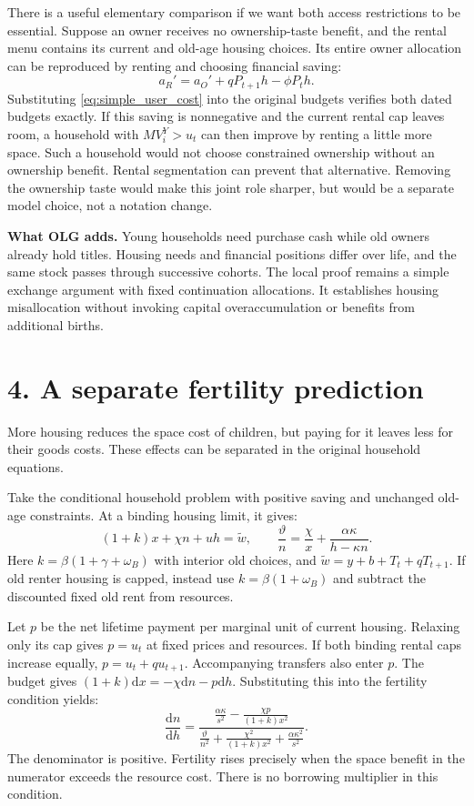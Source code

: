 \documentclass[11pt]{article}
\newcommand{\dd}{\mathrm d}
\newcommand{\pageheading}[1]{\section*{#1}}
\begin{document}
There is a useful elementary comparison if we want both access restrictions
to be essential. Suppose an owner receives no ownership-taste benefit, and
the rental menu contains its current and old-age housing choices. Its entire
owner allocation can be reproduced by renting and choosing financial saving:
\begin{equation}
 a_R'=a_O'+qP_{t+1}h-\phi P_t h.
 \label{eq:simple_replication}
\end{equation}
Substituting \eqref{eq:simple_user_cost} into the original budgets verifies
both dated budgets exactly. If this saving is nonnegative and the current
rental cap leaves room, a household with $MV_i^Y>u_t$ can then improve by
renting a little more space. Such a household would not choose constrained
ownership without an ownership benefit. Rental segmentation can prevent that
alternative. Removing the ownership taste would make this joint role sharper,
but would be a separate model choice, not a notation change.

\textbf{What OLG adds.} Young households need purchase cash while old owners
already hold titles. Housing needs and financial positions differ over life,
and the same stock passes through successive cohorts. The local proof remains
a simple exchange argument with fixed continuation allocations. It establishes
housing misallocation without invoking capital overaccumulation or benefits
from additional births.

\newpage
\pageheading{4. A separate fertility prediction}

More housing reduces the space cost of children, but paying for it leaves
less for their goods costs. These effects can be separated in the original
household equations.

Take the conditional household problem with positive saving and unchanged
old-age constraints. At a binding housing limit, it gives:
\begin{equation}
 (1+k)x+\chi n+uh=\widetilde w,\qquad
 \frac{\vartheta}{n}=\frac{\chi}{x}+\frac{\alpha\kappa}{h-\kappa n}.
 \label{eq:simple_fertility_system}
\end{equation}
Here $k=\beta(1+\gamma+\omega_B)$ with interior old choices, and
$\widetilde w=y+b+T_t+qT_{t+1}$. If old renter housing is capped, instead use
$k=\beta(1+\omega_B)$ and subtract the discounted fixed old rent from resources.

Let $p$ be the net lifetime payment per marginal unit of current housing.
Relaxing only its cap gives $p=u_t$ at fixed prices and resources. If both
binding rental caps increase equally, $p=u_t+qu_{t+1}$. Accompanying transfers
also enter $p$. The budget gives $(1+k)\dd x=-\chi\dd n-p\dd h$.
Substituting this into the fertility condition yields:
\begin{equation}
 \frac{\dd n}{\dd h}=
 \frac{\displaystyle\frac{\alpha\kappa}{s^2}
 -\frac{\chi p}{(1+k)x^2}}
 {\displaystyle\frac{\vartheta}{n^2}
 +\frac{\chi^2}{(1+k)x^2}+\frac{\alpha\kappa^2}{s^2}}.
 \label{eq:simple_fertility_derivative}
\end{equation}
The denominator is positive. Fertility rises precisely when the space benefit
in the numerator exceeds the resource cost. There is no borrowing multiplier
in this condition.
\end{document}
